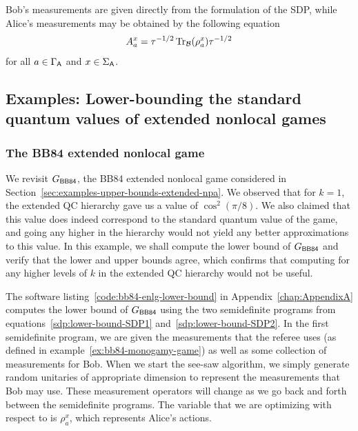 
Bob's measurements are given directly from the formulation of the SDP, while Alice's measurements may be obtained by the following equation
\begin{align} \label{eq:extract-alice-meas-ops-lb}
	A_a^x = \tau^{-1/2} \operatorname{Tr}_{\mathcal{B}}(\rho_a^x) \tau^{-1/2}
\end{align} 
for all $a \in \Gamma_{\mathsf{A}}$ and $x \in \Sigma_{\mathsf{A}}$. 

\subsection{Examples: Lower-bounding the standard quantum values of extended nonlocal games} \label{sec:examples-lower-bounds}

\subsubsection*{The BB84 extended nonlocal game}

We revisit $G_{\BB84}$, the BB84 extended nonlocal game considered in Section~\ref{sec:examples-upper-bounds-extended-npa}. We observed that for $k = 1$, the extended QC hierarchy gave us a value of $\cos^2(\pi/8)$. We also claimed that this value does indeed correspond to the standard quantum value of the game, and going any higher in the hierarchy would not yield any better approximations to this value. In this example, we shall compute the lower bound of $G_{\BB84}$ and verify that the lower and upper bounds agree, which confirms that computing for any higher levels of $k$ in the extended QC hierarchy would not be useful.

The software listing~\ref{code:bb84-enlg-lower-bound} in Appendix~\ref{chap:AppendixA} computes the lower bound of $G_{\BB84}$ using the two semidefinite programs from equations~\eqref{sdp:lower-bound-SDP1} and~\eqref{sdp:lower-bound-SDP2}. In the first semidefinite program, we are given the measurements that the referee uses (as defined in example~\ref{ex:bb84-monogamy-game}) as well as some collection of measurements for Bob. When we start the see-saw algorithm, we simply generate random unitaries of appropriate dimension to represent the measurements that Bob may use. These measurement operators will change as we go back and forth between the semidefinite programs. The variable that we are optimizing with respect to is $\rho_a^x$, which represents Alice's actions. 

